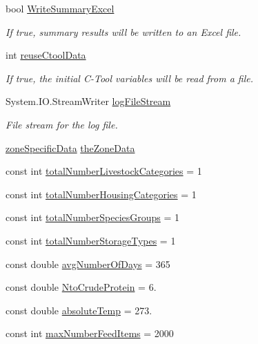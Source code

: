 \begin{DoxyCompactItemize}
bool \mbox{\hyperlink{class_global_vars_acc134ab3675bd4d699ae33e0469b46f5}{Write\+Summary\+Excel}}
\begin{DoxyCompactList}\small\item\em If true, summary results will be written to an Excel file. \end{DoxyCompactList}\item 
int \mbox{\hyperlink{class_global_vars_a9b407972734f633b8f613181750a9c6a}{reuse\+Ctool\+Data}}
\begin{DoxyCompactList}\small\item\em If true, the initial C-\/\+Tool variables will be read from a file. \end{DoxyCompactList}\item 
System.\+I\+O.\+Stream\+Writer \mbox{\hyperlink{class_global_vars_a887d3b4680e3797b1ae8b50cf1c27cab}{log\+File\+Stream}}
\begin{DoxyCompactList}\small\item\em File stream for the log file. \end{DoxyCompactList}\item 
\mbox{\hyperlink{struct_global_vars_1_1zone_specific_data}{zone\+Specific\+Data}} \mbox{\hyperlink{class_global_vars_ad34af19719a8fc947535a16c4d5c76fe}{the\+Zone\+Data}}
\item 
const int \mbox{\hyperlink{class_global_vars_aa4e88e5ce5c59c8b642c280396988cb5}{total\+Number\+Livestock\+Categories}} = 1
\item 
const int \mbox{\hyperlink{class_global_vars_a4e80a5a5419e29da540273804415745d}{total\+Number\+Housing\+Categories}} = 1
\item 
const int \mbox{\hyperlink{class_global_vars_aaf5354777047b9ba841b4a01b3fca6b9}{total\+Number\+Species\+Groups}} = 1
\item 
const int \mbox{\hyperlink{class_global_vars_a629807f3a2984264729392fe2c2bd3e0}{total\+Number\+Storage\+Types}} = 1
\item 
const double \mbox{\hyperlink{class_global_vars_a7d5c0478f453bab8cc1d05aac2539ee0}{avg\+Number\+Of\+Days}} = 365
\item 
const double \mbox{\hyperlink{class_global_vars_af457f71344887d7f092c0a8190bf47ef}{Nto\+Crude\+Protein}} = 6.
\item 
const double \mbox{\hyperlink{class_global_vars_a31a168417d1ba6735c7a7014f2d12a33}{absolute\+Temp}} = 273.
\item 
const int \mbox{\hyperlink{class_global_vars_a42fa58d4be2a863e36b4ec8e8bee69cd}{max\+Number\+Feed\+Items}} = 2000

\end{DoxyCompactItemize}
